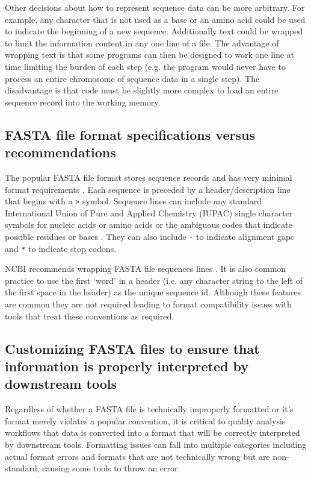 \documentclass{bmcart}
\begin{document}
Other decisions about how to represent sequence data can be more arbitrary. For example, any character that is not used as a base or an amino acid could be used to indicate the beginning of a new sequence. Additionally text could be wrapped to limit the information content in any one line of a file. The advantage of wrapping text is that some programs can then be designed to work one line at time limiting the burden of each step (e.g. the program would never have to process an entire chromosome of sequence data in a single step). The disadvantage is that code must be slightly more complex to load an entire sequence record into the working memory.

\subsection{FASTA file format specifications versus recommendations}

The popular FASTA file format stores sequence records and has very minimal format requirements  \cite{FASTAformat}. Each sequence is preceded by a header/description line that begins with a \verb|>| symbol. Sequence lines can include any standard International Union of Pure and Applied Chemistry (IUPAC) single character symbols for nucleic acids or amino acids or the ambiguous codes that indicate possible residues or bases \cite{comm1970abbreviations}. They can also include \verb|-| to indicate alignment gaps and \verb|*| to indicate stop codons. 

NCBI recommends wrapping FASTA file sequences lines \cite{FASTAformat}. It is also common practice to use the first `word' in a header (i.e. any character string to the left of the first space in the header) as the unique sequence id. Although these features are common they are not required leading to format compatibility issues with tools that treat these conventions as required.
 
 \subsection{Customizing FASTA files to ensure that information is properly interpreted by downstream tools}

Regardless of whether a FASTA file is technically improperly formatted or it's format merely violates a popular convention, it is critical to quality analysis workflows that data is converted into a format that will be correctly interpreted by downstream tools. Formatting issues can fall into multiple categories including actual format errors and formats that are not technically wrong but are non-standard,  causing some tools to throw an error. 
\end{document}
